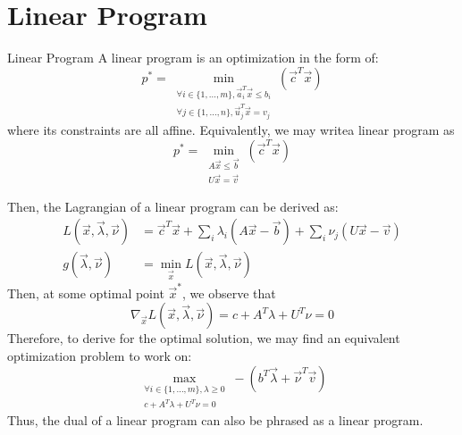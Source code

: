 \section{Linear Program}
\begin{ln-define}{Linear Program}{}
    A linear program is an optimization in the form of:
    \[
        p^* = \min_{
            \substack{
                \forall i \in \{1, \dots, m\}, \vec{a}_i^T \vec{x} \leq b_i \\
                \forall j \in \{1, \dots, n\}, \vec{u}_j^T \vec{x} = v_j
            }
        } (\vec{c}^T \vec{x})
    \]
    where its constraints are all affine.
    Equivalently, we may writea linear program as
    \[
        p^* = \min_{
            \substack{
                A \vec{x} \leq \vec{b} \\
                U \vec{x} = \vec{v}
            }
        } (\vec{c}^T \vec{x})
    \]
\end{ln-define}
Then, the Lagrangian of a linear program can be derived as:
\begin{align*}
    L(\vec{x}, \vec{\lambda}, \vec{\nu}) &= \vec{c}^T \vec{x} + \sum_i \lambda_i (A \vec{x} - \vec{b}) + \sum_i \nu_j (U \vec{x} - \vec{v}) \\
    g(\vec{\lambda}, \vec{\nu}) &= \min_{\vec{x}} L(\vec{x}, \vec{\lambda}, \vec{\nu})
\end{align*}
Then, at some optimal point $\vec{x}^*$, we observe that
\[
    \nabla_{\vec{x}} L(\vec{x}, \vec{\lambda}, \vec{\nu}) = c + A^T \lambda + U^T \nu = 0
\]
Therefore, to derive for the optimal solution, we may find an equivalent optimization problem to work on:
\[
    \max_{
        \substack{
            \forall i \in \{1, \dots, m\}, \lambda \geq 0 \\
            c + A^T \lambda + U^T \nu = 0
        }
    } -(b^T \vec{\lambda} + \vec{\nu}^T \vec{v})
\]
Thus, the dual of a linear program can also be phrased as a linear program.
